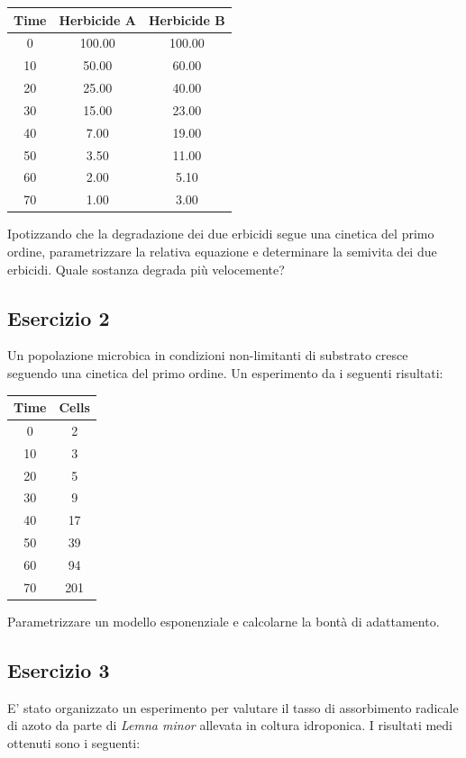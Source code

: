 \documentclass[a4paper,12pt,oneside]{book}
\begin{document}
\begin{longtable}[]{@{}ccc@{}}
\toprule
Time & Herbicide A & Herbicide B \\
\midrule
\endhead
0 & 100.00 & 100.00 \\
10 & 50.00 & 60.00 \\
20 & 25.00 & 40.00 \\
30 & 15.00 & 23.00 \\
40 & 7.00 & 19.00 \\
50 & 3.50 & 11.00 \\
60 & 2.00 & 5.10 \\
70 & 1.00 & 3.00 \\
\bottomrule
\end{longtable}

Ipotizzando che la degradazione dei due erbicidi segue una cinetica del primo ordine, parametrizzare la relativa equazione e determinare la semivita dei due erbicidi. Quale sostanza degrada più velocemente?

\hypertarget{esercizio-2-8}{%
\subsection{Esercizio 2}\label{esercizio-2-8}}

Un popolazione microbica in condizioni non-limitanti di substrato cresce seguendo una cinetica del primo ordine. Un esperimento da i seguenti risultati:

\begin{longtable}[]{@{}cc@{}}
\toprule
Time & Cells \\
\midrule
\endhead
0 & 2 \\
10 & 3 \\
20 & 5 \\
30 & 9 \\
40 & 17 \\
50 & 39 \\
60 & 94 \\
70 & 201 \\
\bottomrule
\end{longtable}

Parametrizzare un modello esponenziale e calcolarne la bontà di adattamento.

\hypertarget{esercizio-3-7}{%
\subsection{Esercizio 3}\label{esercizio-3-7}}

E' stato organizzato un esperimento per valutare il tasso di assorbimento radicale di azoto da parte di \emph{Lemna minor} allevata in coltura idroponica. I risultati medi ottenuti sono i seguenti:
\end{document}
